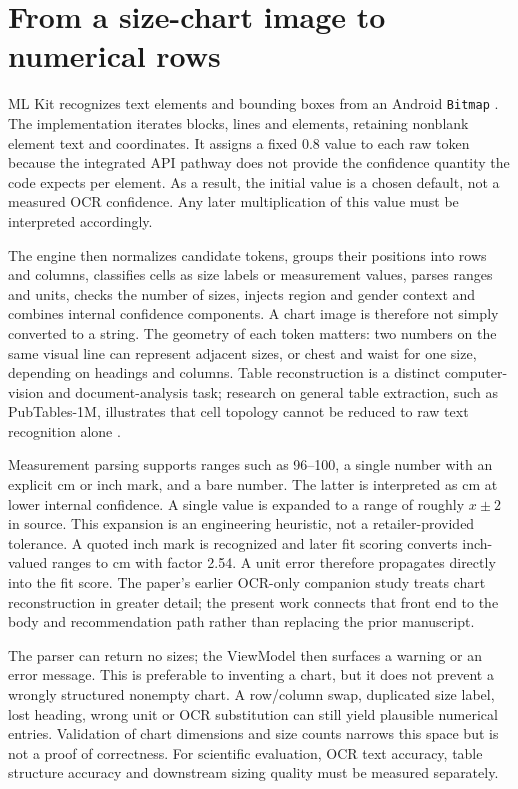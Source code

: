 \documentclass[11pt,a4paper]{article}
\begin{document}
\section{From a size-chart image to numerical rows}
ML Kit recognizes text elements and bounding boxes from an Android \texttt{Bitmap} \cite{mlkit}. The implementation iterates blocks, lines and elements, retaining nonblank element text and coordinates. It assigns a fixed 0.8 value to each raw token because the integrated API pathway does not provide the confidence quantity the code expects per element. As a result, the initial value is a chosen default, not a measured OCR confidence. Any later multiplication of this value must be interpreted accordingly.

The engine then normalizes candidate tokens, groups their positions into rows and columns, classifies cells as size labels or measurement values, parses ranges and units, checks the number of sizes, injects region and gender context and combines internal confidence components. A chart image is therefore not simply converted to a string. The geometry of each token matters: two numbers on the same visual line can represent adjacent sizes, or chest and waist for one size, depending on headings and columns. Table reconstruction is a distinct computer-vision and document-analysis task; research on general table extraction, such as PubTables-1M, illustrates that cell topology cannot be reduced to raw text recognition alone \cite{pubtables}.

Measurement parsing supports ranges such as 96--100, a single number with an explicit cm or inch mark, and a bare number. The latter is interpreted as cm at lower internal confidence. A single value is expanded to a range of roughly $x\pm2$ in source. This expansion is an engineering heuristic, not a retailer-provided tolerance. A quoted inch mark is recognized and later fit scoring converts inch-valued ranges to cm with factor 2.54. A unit error therefore propagates directly into the fit score. The paper's earlier OCR-only companion study treats chart reconstruction in greater detail; the present work connects that front end to the body and recommendation path rather than replacing the prior manuscript.

The parser can return no sizes; the ViewModel then surfaces a warning or an error message. This is preferable to inventing a chart, but it does not prevent a wrongly structured nonempty chart. A row/column swap, duplicated size label, lost heading, wrong unit or OCR substitution can still yield plausible numerical entries. Validation of chart dimensions and size counts narrows this space but is not a proof of correctness. For scientific evaluation, OCR text accuracy, table structure accuracy and downstream sizing quality must be measured separately.
\end{document}

